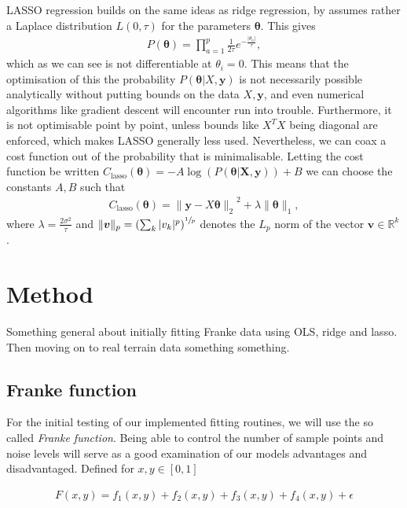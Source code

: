 \documentclass[twocolumn,english,notitlepage]{article}
\renewcommand{\vec}[1]{\boldsymbol{#1}}
\newcommand{\pclosed}[1]{\left(#1\right)}
\renewcommand{\norm}[2][]{\ensuremath{\|#2\|_{#1}}}
\renewcommand{\exp}[1]{e^{#1}}
\newcommand{\msub}[2]{\ensuremath{{#1}_\text{#2}}}
\begin{document}
            LASSO regression builds on the same ideas as ridge regression, by assumes rather a Laplace distribution $L(0, \tau)$ for the parameters $\vec{\theta}$. This gives
            \begin{align}
                P(\vec{\theta}) = \prod_{a=1}^{p} \frac{1}{2\tau} \exp{-\frac{|\theta_a|}{\tau}},
            \end{align}
            which as we can see is not differentiable at $\theta_i = 0$. This means that the optimisation of this the probability $P(\vec{\theta}|X, \vec{y})$ is not necessarily possible analytically without putting bounds on the data $X, \vec{y}$, and even numerical algorithms like gradient descent will encounter run into trouble. Furthermore, it is not optimisable point by point, unless bounds like $X^TX$ being diagonal are enforced, which makes LASSO generally less used. Nevertheless, we can coax a cost function out of the probability that is minimalisable. Letting the cost function be written $\msub{C}{lasso}(\vec{\theta}) = -A\log\pclosed{P(\vec{\theta|X,\vec{y}})} + B$  we can choose the constants $A, B$ such that
            \begin{align}
                \boxed{
                    \msub{C}{lasso}(\vec{\vec{\theta}}) = \norm[2]{ \vec{y} - X\vec{\theta} }^2 + \lambda \norm[1]{\vec{\theta}},
                }
            \end{align}
            where $\lambda = \frac{2\sigma^2}{\tau}$ and $\norm[p]{\vec{v}} = \pclosed{\sum_k |v_k|^p}^{\sfrac{1}{p}}$ denotes the $L_p$ norm of the vector $\vec{v} \in \mathbb{R}^k$.

\section{Method}
Something general about initially fitting Franke data using OLS, ridge and lasso. Then moving on to real terrain data something something.
    
    \subsection{Franke function}

    For the initial testing of our implemented fitting routines, we will use the so called \textit{Franke function}. Being able to control the number of sample points and noise levels will serve as a good examination of our models advantages and disadvantaged. Defined for $x, y \in [0,1]$

    \begin{align}
        F(x,y) = f_1(x,y) + f_2(x,y) + f_3(x,y) + f_4(x,y) + \epsilon \label{eq:met:Franke_Function}
    \end{align}
\end{document}
